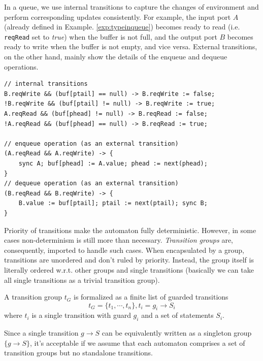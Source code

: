 \begin{example} In a queue, we use internal transitions to capture the changes of environment and perform corresponding updates consistently. For example, the input port $A$ (already defined in Example. \ref{exp:typeinqueue}) becomes ready to read (i.e. \texttt{reqRead} set to \emph{true}) when the buffer is not full, and the output port $B$ becomes ready to write when the buffer is not empty, and vice versa. External transitions, on the other hand, mainly show the details of the enqueue and dequeue operations.
\begin{lstlisting}
// internal transitions
B.reqWrite && (buf[ptail] == null) -> B.reqWrite := false;
!B.reqWrite && (buf[ptail] != null) -> B.reqWrite := true;
A.reqRead && (buf[phead] != null) -> B.reqRead := false;
!A.reqRead && (buf[phead] == null) -> B.reqRead := true;

// enqueue operation (as an external transition)
(A.reqRead && A.reqWrite) -> {
    sync A; buf[phead] := A.value; phead := next(phead);
}
// dequeue operation (as an external transition)
(B.reqRead && B.reqWrite) -> {
    B.value := buf[ptail]; ptail := next(ptail); sync B;
}
\end{lstlisting}
\label{exp:trans_queue}
\end{example}

Priority of transitions make the automaton fully deterministic. However, in some cases non-determinism is still more than necessary. \emph{Transition groups} are, consequently, imported to handle such cases. When encapsulated by a group, transitions are unordered and don't ruled by priority. Instead, the group itself is literally ordered w.r.t. other groups and single transitions (basically we can take all single transitions as a trivial transition group).

\begin{formalization}
    A transition group $t_G$ is formalized as a finite list of guarded transitions
    \[
        t_G=\{t_1,\cdots, t_n\}, t_i=g_i\rightarrow S_i
    \]
    where $t_i$ is a single transition with guard $g_i$ and a set of statements $S_i$.
    \label{fmz:tgroup}
\end{formalization}

Since a single transition $g\rightarrow S$ can be equivalently written as a singleton group $\{g\rightarrow S\}$, it's acceptable if we assume that each automaton comprises a set of transition groups but no standalone transitions.


